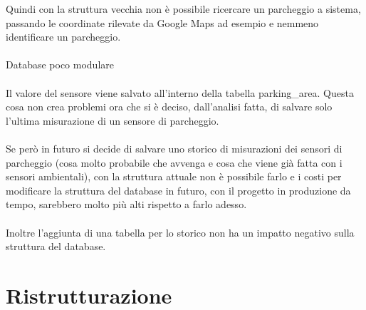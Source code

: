 Quindi con la struttura vecchia non è possibile ricercare un parcheggio a sistema, passando le coordinate rilevate da Google
Maps ad esempio e nemmeno identificare un parcheggio.
\\\\
Database poco modulare
\\\\
Il valore del sensore viene salvato all'interno della tabella parking\_area. Questa cosa non crea problemi ora che 
si è deciso, dall'analisi fatta, di salvare solo l'ultima misurazione di un sensore di parcheggio.
\\\\
Se però in futuro si decide di salvare uno storico di misurazioni dei sensori di parcheggio (cosa molto probabile che
avvenga e cosa che viene già fatta con i sensori ambientali), con la struttura attuale non è possibile farlo e i costi
per modificare la struttura del database in futuro, con il progetto in produzione da tempo, sarebbero molto più
alti rispetto a farlo adesso.
\\\\
Inoltre l'aggiunta di una tabella per lo storico non ha un impatto negativo sulla struttura del database.

\section{Ristrutturazione}

